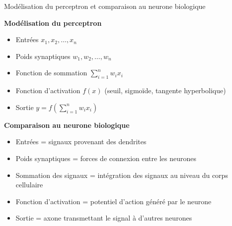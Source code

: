 \documentclass{beamer}
\begin{document}
\begin{frame}{Modélisation du perceptron et comparaison au neurone biologique}
	
	\textbf{Modélisation du perceptron}
	\begin{itemize}
		\item Entrées $x_1, x_2, \dots, x_n$
		\item Poids synaptiques $w_1, w_2, \dots, w_n$
		\item Fonction de sommation $\sum_{i=1}^{n} w_i x_i$
		\item Fonction d'activation $f(x)$ (seuil, sigmoïde, tangente hyperbolique)
		\item Sortie $y = f\left(\sum_{i=1}^{n} w_i x_i\right)$
	\end{itemize}
	\textbf{Comparaison au neurone biologique}
	\begin{itemize}
		\item Entrées = signaux provenant des dendrites
		\item Poids synaptiques = forces de connexion entre les neurones
		\item Sommation des signaux = intégration des signaux au niveau du corps cellulaire
		\item Fonction d'activation = potentiel d'action généré par le neurone
		\item Sortie = axone transmettant le signal à d'autres neurones
	\end{itemize}

	
\end{frame}
\end{document}
